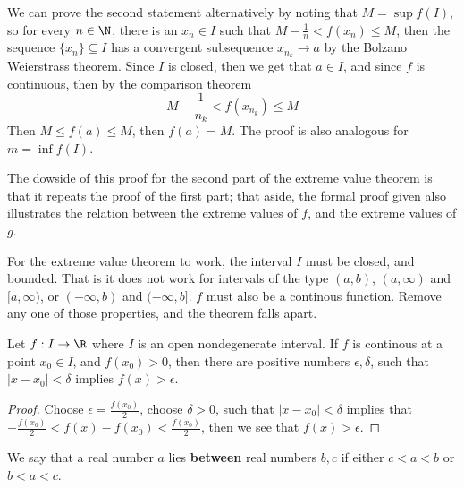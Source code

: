 We can prove the second statement alternatively by noting that $M=\sup{f(I)}$, 
so for every  $n \in \N$, there is an  $x_n \in I$ such that $M-\frac{1}{n}<f(x_n)
\leq M$, then the sequence $\{x_n\} \subseteq I$ has a convergent subsequence $x_{n_k} \rightarrow a$ by 
the Bolzano Weierstrass theorem. Since $I$ is closed, then we get that  $a \in I$, 
and since $f$ is continuous, then by the comparison theorem
    \begin{equation*}
        M-\frac{1}{n_k}<f(x_{n_k}) \leq M
    \end{equation*}
Then $M \leq f(a) \leq M$, then $f(a)=M$. The proof is also analogous for $m=\inf{f(I)}$.

The dowside of this proof for the second part of the extreme value theorem is that 
it repeats the proof of the first part; that aside, the formal proof given also 
illustrates the relation between the extreme values of $f$, and the extreme values 
of $g$.

For the extreme value theorem to work, the interval $I$ must be closed, and 
bounded. That is it does not work for intervals of the type  $(a,b)$, $(a, \infty)$ and 
$[a,\infty)$, or  $(-\infty, b)$ and  $(-\infty,b]$. $f$ must also be a continous 
function. Remove any one of those properties, and the theorem falls apart.

\begin{lemma}\label{3.3.5}
    Let $f:I \rightarrow \R$ where $I$ is an open nondegenerate interval. If  $f$ is continous 
    at a point  $x_0 \in I$, and  $f(x_0)>0$, then there are positive numbers  $\epsilon,\delta$, such that
    $|x-x_0|<\delta$ implies  $f(x)>\epsilon$.
\end{lemma}
\begin{proof}
    Choose $\epsilon=\frac{f(x_0)}{2}$, choose $\delta>0$, such that  $|x-x_0|<\delta$ implies that
    $-\frac{f(x_0)}{2}<f(x)-f(x_0)<\frac{f(x_0)}{2}$, then we see that $f(x)>\epsilon$.
\end{proof}

\begin{definition}
    We say that a real number $a$ lies \textbf{between} real numbers  $b,c$ if  either $c<a<b$ 
    or $b<a<c$.
\end{definition}


